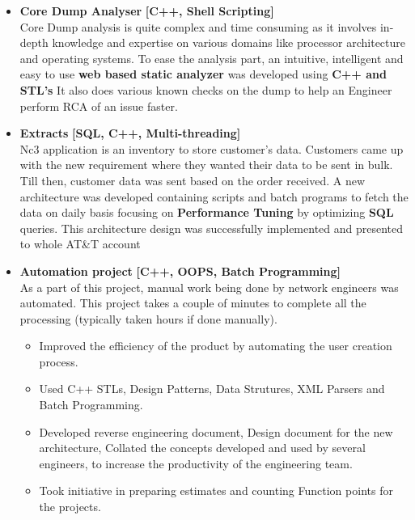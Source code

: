 \documentclass{system}
\begin{document}
\begin{resume}
\begin{itemize}
\begin{itemize}
        \item {\bfseries Core Dump Analyser} \hfill {\bfseries [C++, Shell Scripting]}\\
        Core Dump analysis is quite complex and time consuming as it involves in-depth knowledge and expertise on various domains 
        like processor architecture and operating systems. To ease the analysis part,
        an intuitive, intelligent and easy to use {\bfseries web based static analyzer}
        was developed using {\bfseries C++ and STL's} 
        It also does various known checks on the dump to help an Engineer perform RCA
        of an issue faster. 
        \hspace{0.1in}

        \item {\bfseries Extracts} \hfill { \bfseries [SQL, C++,
        Multi-threading]}\\
        Nc3 application is an inventory to store customer’s data. Customers came up 
        with the new requirement where they wanted their data to be sent in bulk. Till
        then, customer data was sent based on the order received. A new
        architecture was developed containing scripts and batch programs to fetch the data on
        daily basis focusing on {\bfseries Performance Tuning} by optimizing
        {\bfseries SQL} queries. This architecture
        design was successfully implemented and presented to whole AT\&T account 
        \hspace{0.1in} 

        \item {\bfseries Automation project } \hfill {\bfseries [C++, OOPS, Batch
        Programming]} \\
        As a part of this project, manual work being done by network engineers was automated.
        This project takes a couple of minutes to complete all the processing (typically taken hours if done manually).  
        \begin{itemize} \itemsep 2pt 
            \item Improved the efficiency of the product by automating the user creation
            process.
            \item Used C++ STLs, Design Patterns, Data Strutures, XML Parsers and Batch
            Programming.
            \item  Developed reverse engineering document,  Design document
            for the new architecture, Collated the concepts developed and used by several 
            engineers, to increase the productivity of the engineering team.
            \item  Took initiative in preparing estimates and counting Function points for the
            projects.
        \end{itemize}
    \end{itemize}


\end{itemize}
\end{resume}
\end{document}
